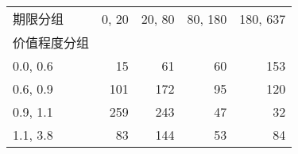 \begin{tabular}{lrrrr}
\toprule
期限分组 &  0, 20 &  20, 80 &  80, 180 &  180, 637 \\
价值程度分组 &          &           &            &             \\
\midrule
0.0, 0.6    &       15 &        61 &         60 &         153 \\
0.6, 0.9    &      101 &       172 &         95 &         120 \\
0.9, 1.1    &      259 &       243 &         47 &          32 \\
1.1, 3.8    &       83 &       144 &         53 &          84 \\
\bottomrule
\end{tabular}
